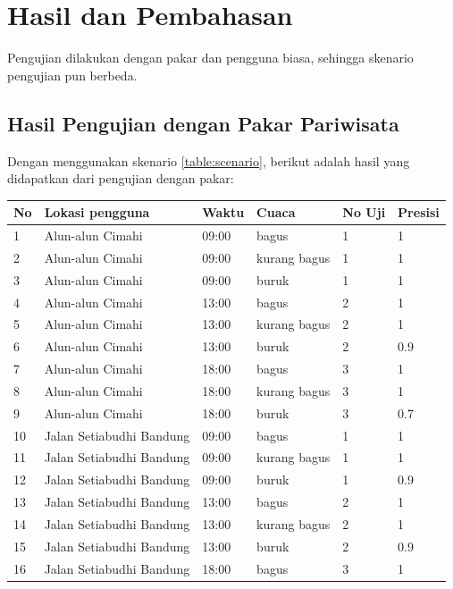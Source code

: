 \chapter{Hasil dan Pembahasan}

\par
Pengujian dilakukan dengan pakar dan pengguna biasa, sehingga skenario pengujian pun berbeda.
\section{Hasil Pengujian dengan Pakar Pariwisata}

\par
Dengan menggunakan skenario \ref{table:scenario}, berikut adalah hasil yang didapatkan dari pengujian dengan pakar:
\begin{center}
\small
\begin{longtable}{ |l|l|l|l|l|l| } 
\hline
\textbf{No} & \textbf{Lokasi pengguna} & \textbf{Waktu} & \textbf{Cuaca} & \textbf{No Uji} & \textbf{Presisi}\\
\hline
1	&	Alun-alun Cimahi	&	09:00	& bagus & 1 & 1\\
\hline
2	&	Alun-alun Cimahi	&	09:00	& kurang bagus & 1 & 1\\
\hline
3	&	Alun-alun Cimahi	&	09:00	& buruk & 1 & 1\\
\hline
4	&	Alun-alun Cimahi	&	13:00	& bagus & 2 & 1\\
\hline
5	&	Alun-alun Cimahi	&	13:00	& kurang bagus & 2 & 1\\
\hline
6	&	Alun-alun Cimahi	&	13:00	& buruk & 2 & 0.9\\
\hline
7	&	Alun-alun Cimahi	&	18:00	& bagus & 3 & 1\\
\hline
8	&	Alun-alun Cimahi	&	18:00	& kurang bagus & 3 & 1\\
\hline
9	&	Alun-alun Cimahi	&	18:00	& buruk & 3 & 0.7\\
\hline
10	&	Jalan Setiabudhi Bandung	&	09:00	& bagus & 1 & 1\\
\hline
11	&	Jalan Setiabudhi Bandung	&	09:00	& kurang bagus & 1 & 1 \\
\hline
12	&	Jalan Setiabudhi Bandung	&	09:00	& buruk & 1 & 0.9\\
\hline
13	&	Jalan Setiabudhi Bandung	&	13:00	& bagus & 2 & 1\\
\hline
14	&	Jalan Setiabudhi Bandung	&	13:00	& kurang bagus & 2 & 1\\
\hline
15	&	Jalan Setiabudhi Bandung	&	13:00	& buruk & 2 & 0.9\\
\hline
16	&	Jalan Setiabudhi Bandung	&	18:00	& bagus & 3 & 1\\

\end{longtable}
\end{center}
